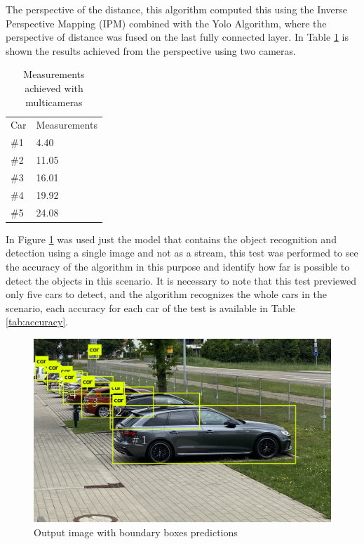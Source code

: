 The perspective of the distance, this algorithm computed this using the Inverse Perspective Mapping (IPM) combined with the Yolo Algorithm, where the perspective of distance was fused on the last fully connected layer. In Table \ref{tab:output_framework} is shown the results achieved from the perspective using two cameras. 

\begin{table}[H]
\centering
\caption{Measurements achieved with multicameras}
\begin{tabular}{l|l} 
\toprule
Car &  Measurements      \\
\#1   & 4.40        \\
\#2   & 11.05       \\
\#3   & 16.01       \\
\#4   & 19.92       \\
\#5   & 24.08       \\
\bottomrule
\end{tabular}
\label{tab:output_framework}
\end{table} 
 

In Figure \ref{fig:park_predict} was used just the model that contains the object recognition and detection using a single image and not as a stream, this test was performed to see the accuracy of the algorithm in this purpose and identify how far is possible to detect the objects in this scenario. It is necessary to note that this test previewed only five cars to detect, and the algorithm recognizes the whole cars in the scenario, each accuracy for each car of the test is available in Table \ref{tab:accuracy}.


\begin{figure}[H]
\centering
\includegraphics[scale=0.3]{imagens/predictions.jpg}
\caption{Output image with boundary boxes predictions}
\label{fig:park_predict}
\end{figure}




